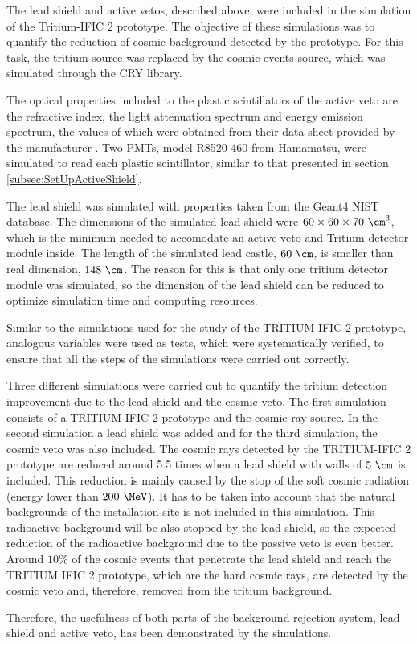 The lead shield and active vetos, described above, were included in the simulation of the Tritium-IFIC 2 prototype. The objective of these simulations was to quantify the reduction of cosmic background detected by the prototype. For this task, the tritium source was replaced by the cosmic events source, which was simulated through the CRY library.


The optical properties included to the plastic scintillators of the active veto are the refractive index, the light attenuation spectrum and energy emission spectrum, the values of which were obtained from their data sheet provided by the manufacturer \cite{ScintillatorVeto}. Two PMTs, model R8520-460 from Hamamatsu, were simulated to read each plastic scintillator, similar to that presented in section \ref{subsec:SetUpActiveShield}.

The lead shield was simulated with properties taken from the Geant4 NIST database. The dimensions of the simulated lead shield were $60 \times 60 \times 70~\cm^3$, which is the minimum needed to accomodate an active veto and Tritium detector module inside. The length of the simulated lead castle, $60~\cm$, is smaller than real dimension, $148~\cm$. The reason for this is that only one tritium detector module was simulated, so the dimension of the lead shield can be reduced to optimize simulation time and computing resources.

Similar to the simulations used for the study of the TRITIUM-IFIC 2 prototype, analogous variables were used as tests, which were systematically verified, to ensure that all the steps of the simulations were carried out correctly.

Three different simulations were carried out to quantify the tritium detection improvement due to the lead shield and the cosmic veto. The first simulation consists of a TRITIUM-IFIC 2 prototype and the cosmic ray source. In the second simulation a lead shield was added and for the third simulation, the cosmic veto was also included. The cosmic rays detected by the TRITIUM-IFIC 2 prototype are reduced around 5.5 times when a lead shield with walls of $5~\cm$ is included. This reduction is mainly caused by the stop of the soft cosmic radiation (energy lower than $200~\MeV$). It has to be taken into account that the natural backgrounds of the installation site is not included in this simulation. This radioactive background will be also stopped by the lead shield, so the expected reduction of the radioactive background due to the passive veto is even better. Around $10\%$ of the cosmic events that penetrate the lead shield and reach the TRITIUM IFIC 2 prototype, which are the hard cosmic rays, are detected by the cosmic veto and, therefore, removed from the tritium background.

Therefore, the usefulness of both parts of the background rejection system, lead shield and active veto, has been demonstrated by the simulations.